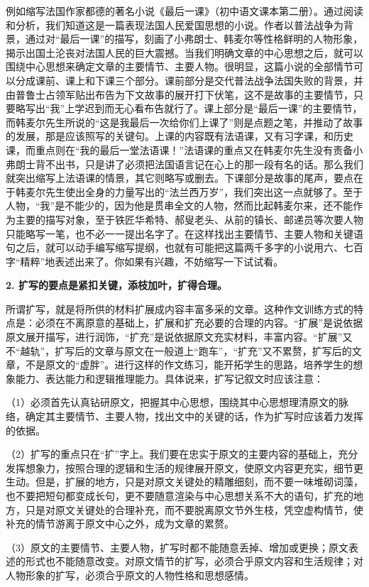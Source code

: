 例如缩写法国作家都德的著名小说《最后一课》（初中语文课本第二册）。通过阅读和分析，我们知道这是一篇表现法国人民爱国思想的小说。作者以普法战争为背景，通过对“最后一课”的描写，刻画了小弗朗士、韩麦尔等性格鲜明的人物形象，揭示出国土沦丧对法国人民的巨大震撼。当我们明确文章的中心思想之后，就可以围绕中心思想来确定文章的主要情节、主要人物。很明显，这篇小说的全部情节可以分成课前、课上和下课三个部分。课前部分是交代普法战争法国失败的背景，并由普鲁士占领军贴出布告为下文故事的展开打下伏笔，这不是故事的主要情节，只要略写出“我”上学迟到而无心看布告就行了。课上部分是“最后一课”的主要情节，而韩麦尔先生所说的“这是我最后一次给你们上课了”则是点题之笔，并推动了故事的发展，那是应该照写的关键句。上课的内容既有法语课，又有习字课，和历史课，而重点则在“我的最后一堂法语课！”法语课的重点又在韩麦尔先生没有责备小弗朗士背不出书，只是讲了必须把法国语言记在心上的那一段有名的话。那么我们就突出缩写上法语课的情景，其它则略写或删去。下课部分是故事的尾声，要点在于韩麦尔先生使出全身的力量写出的“法兰西万岁”，我们突出这一点就够了。至于人物，“我”是不能少的，因为他是贯串全文的人物，然而比起韩麦尔来，还不能作为主要的描写对象，至于铁匠华希特、郝叟老头、从前的镇长、邮递员等次要人物只能略写一笔，也不必一一提出名字了。在这样找出主要情节、主要人物和关键语句之后，就可以动手编写缩写提纲，也就有可能把这篇两千多字的小说用六、七百字“精粹”地表述出来了。你如果有兴趣，不妨缩写一下试试看。

\textbf{2. 扩写的要点是紧扣关键，添枝加叶，扩得合理。}

所谓扩写，就是将所供的材料扩展成内容丰富多采的文章。这种作文训练方式的特点是：必须在不离原意的基础上，扩展和扩充必要的合理的内容。“扩展”是说依据原文展开描写，进行润饰，“扩充”是说依据原文充实材料，丰富内容。“扩展”又不“越轨”，扩写后的文章与原文在一般道上“跑车”，“扩充”又不累赘，扩写后的文章，不是原文的“虚胖”。进行这样的作文练习，能开拓学生的思路，培养学生的想象能力、表达能力和逻辑推理能力。具体说来，扩写记叙文时应该注意：

（1）必须首先认真钻研原文，把握其中心思想，围绕其中心思想理清原文的脉络，确定其主要情节、主要人物，找出文中的关键的话，作为扩写时应该着力发挥的依据。

（2）扩写的重点只在“扩”字上。我们要在忠实于原文的主要内容的基础上，充分发挥想象力，按照合理的逻辑和生活的规律展开原文，使原文内容更充实，细节更生动。但是，扩展的地方，只是对原文关键处的精雕细刻，而不要一味堆砌词藻，也不要把短句都变成长句，更不要随意渲染与中心思想关系不大的语句，扩充的地方，只是对原文关键处的合理补充，而不要脱离原文节外生枝，凭空虚构情节，使补充的情节游离于原文中心之外，成为文章的累赘。

（3）原文的主要情节、主要人物，扩写时都不能随意丢掉、增加或更换；原文表述的形式也不能随意改变。对原文情节的扩写，必须合乎原文内容和生活规律；对人物形象的扩写，必须合乎原文的人物性格和思想感情。

